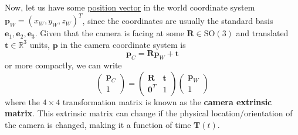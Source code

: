 \documentclass{article}
\begin{document}
  Now, let us have some \hyperref[alg-def:position-vector]{position vector} in the world coordinate system $\mathbf{p}_W = (x_W, y_W, z_W)^T$, since the coordinates are usually the standard basis $\mathbf{e}_1, \mathbf{e}_2, \mathbf{e}_3$. Given that the camera is facing at some $\mathbf{R} \in \mathrm{SO}(3)$ and translated $\mathbf{t} \in \mathbb{R}^3$ units, $\mathbf{p}$ in the camera coordinate system is 
  \begin{equation}
    \mathbf{p}_C = \mathbf{R} \mathbf{p}_W + \mathbf{t}
  \end{equation}
  or more compactly, we can write 
  \begin{equation}
    \begin{pmatrix} \mathbf{p}_C \\ 1 \end{pmatrix} = \begin{pmatrix} \mathbf{R} & \mathbf{t} \\ \mathbf{0}^T & 1 \end{pmatrix} \begin{pmatrix} \mathbf{p}_W \\ 1 \end{pmatrix}
  \end{equation}
  where the $4 \times 4$ transformation matrix is known as the \textbf{camera extrinsic matrix}. This extrinsic matrix can change if the physical location/orientation of the camera is changed, making it a function of time $\mathbf{T}(t)$. 
\end{document}
